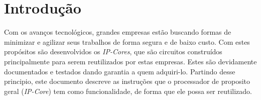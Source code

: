 \section{Introdução}
Com os avanços tecnológicos, grandes empresas estão buscando formas de minimizar e agilizar seus trabalhos de forma segura e de baixo custo. Com estes propósitos são desenvolvidos os \textit{IP-Cores}, que são circuitos construídos principalmente para serem reutilizados por estas empresas. Estes são devidamente documentados e testados dando garantia a quem adquiri-lo. Partindo desse principio, este documento descreve as instruções que o processador de proposito geral (\textit{IP-Core}) tem como funcionalidade, de forma que ele possa ser reutilizado. 